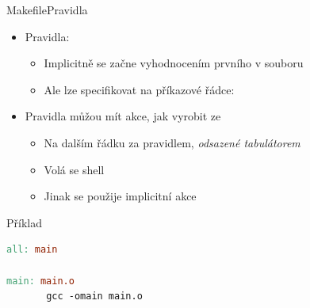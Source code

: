 \begin{frame}[fragile]{Makefile}{Pravidla}

  \begin{itemize}
    \item Pravidla: 
    \begin{itemize}
      \item Implicitně se začne vyhodnocením prvního v souboru

      \pause

      \item Ale lze specifikovat na příkazové řádce: 
    \end{itemize}

    \pause

    \item Pravidla můžou mít akce, jak  vyrobit ze
    \begin{itemize}
      \item Na dalším řádku za pravidlem, \emph{odsazené tabulátorem}

      \pause

      \item Volá se shell

      \pause

      \item Jinak se použije implicitní akce
    \end{itemize}
  \end{itemize}

  \begin{block}{Příklad}
  \begin{lstlisting}[language=make]
all: main

main: main.o
       gcc -omain main.o
  \end{lstlisting}
  \end{block}

\end{frame}

